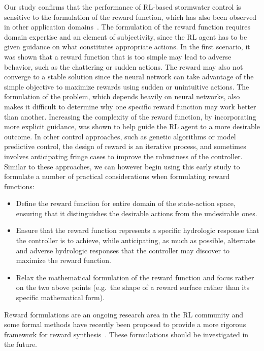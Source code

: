 Our study confirms that the performance of RL-based stormwater control is sensitive to the formulation of the reward function, which has also been observed in other application domains~\cite{ng1999policy}.
The formulation of the reward function requires domain expertise and an element of subjectivity, since the RL agent has to be given guidance on what constitutes appropriate actions.
In the first scenario, it was shown that a reward function that is too simple may lead to adverse behavior, such as the chattering or sudden actions.
The reward may also not converge to a stable solution since the neural network can take advantage of the simple objective to maximize rewards using sudden or unintuitive actions.
The formulation of the problem, which depends heavily on neural networks, also makes it difficult to determine why one specific reward function may work better than another.
Increasing the complexity of the reward function, by incorporating more explicit guidance, was shown to help guide the RL agent to a more desirable outcome. In other control approaches, such as genetic algorithms or model predictive control, the design of reward is an iterative process, and sometimes involves anticipating fringe cases to improve the robustness of the controller.
Similar to these approaches, we can however begin using this early study to formulate a number of practical considerations when formulating reward functions:
\begin{itemize}
    \item Define the reward function for entire domain of the state-action space, ensuring that it distinguishes the desirable actions from the undesirable ones.
    \item Ensure that the reward function represents a specific hydrologic response that the controller is to achieve, while anticipating, as much as possible, alternate and adverse  hydrologic responses that the controller may discover to maximize the reward function.
    \item Relax the mathematical formulation of the reward function and focus rather on the two above points (e.g.\ the shape of a reward surface rather than its specific mathematical form).
\end{itemize}
Reward formulations are an ongoing research area in the RL community and some formal methods have recently been proposed to provide a more rigorous framework for reward synthesis~\cite{fu2017learning}. These formulations should be investigated in the future.


\


